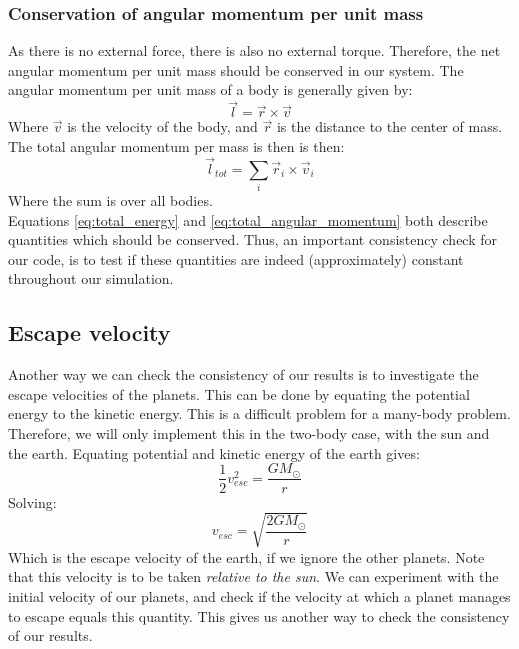 \documentclass[a4paper, 10pt]{article}
\begin{document}
\subsubsection{Conservation of angular momentum per unit mass}
As there is no external force, there is also no external torque. Therefore, the net angular momentum per unit mass should be conserved in our system. The angular momentum per unit mass of a body is generally given by:
$$\vec{l}=\vec{r}\times \vec{v}$$
Where $\vec{v}$ is the velocity of the body, and $\vec{r}$ is the distance to the center of mass. The total angular momentum per mass is then is then:
\begin{equation}\label{eq:total_angular_momentum}
\vec{l}_{tot}=\sum_i \vec{r}_i\times \vec{v}_i
\end{equation}
Where the sum is over all bodies.\\
\linebreak
Equations \ref{eq:total_energy} and \ref{eq:total_angular_momentum} both describe quantities which should be conserved. Thus, an important consistency check for our code, is to test if these quantities are indeed (approximately) constant throughout our simulation.
\subsection{Escape velocity}\label{escape_vel_section}
Another way we can check the consistency of our results is to investigate the escape velocities of the planets. This can be done by equating the potential energy to the kinetic energy. This is a difficult problem for a many-body problem. Therefore, we will only implement this in  the two-body case, with the sun and the earth. Equating potential and kinetic energy of the earth gives: 
$$\frac{1}{2}v_{esc}^2=\frac{GM_{\odot}}{r}$$
Solving:
\begin{equation}
v_{esc}=\sqrt{\frac{2GM_{\odot}}{r}}
\end{equation}
Which is the escape velocity of the earth, if we ignore the other planets. Note that this velocity is to be taken \textit{relative to the sun}. We can experiment with the initial velocity of our planets, and check if the velocity at which a planet manages to escape equals this quantity. This gives us another way to check the consistency of our results.
\end{document}
